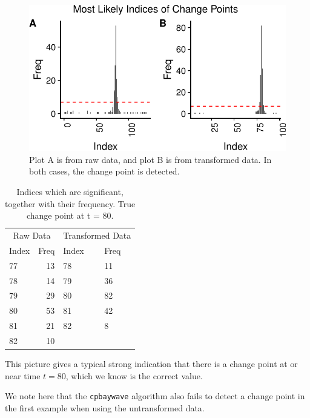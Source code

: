 \documentclass[smallextended]{svjour3}       %
\begin{document}
\begin{example}
\begin{figure}[H]\includegraphics{springer_template_files/figure-latex/chunk_4_5-1} 
\caption{Plot A is from raw data, and plot B is from transformed data. In both cases, the change point is detected.}
\label{fig:3}\end{figure}

\goodbreak
\begin{longtable}[t]{lrll}
\caption{\label{tab:chunk_4_5}Indices which are significant, together with their frequency. True change point at t = 80.}\\
\toprule
\multicolumn{2}{c}{Raw Data} & \multicolumn{2}{c}{Transformed Data} \\
\cmidrule(l{2pt}r{2pt}){1-2} \cmidrule(l{2pt}r{2pt}){3-4}
Index & Freq & Index & Freq\\
\midrule
77 & 13 & 78 & 11\\
78 & 14 & 79 & 36\\
79 & 29 & 80 & 82\\
80 & 53 & 81 & 42\\
81 & 21 & 82 & 8\\
82 & 10 &  & \\
\bottomrule
\end{longtable}

This picture gives a typical strong indication that there is a change
point at or near time \(t = 80\), which we know is the correct value.

We note here that the \texttt{cpbaywave} algorithm also fails to detect
a change point in the first example when using the untransformed data.
\end{example}
\end{document}
